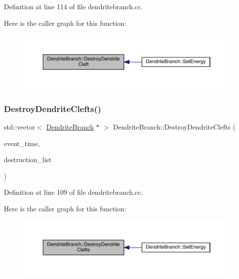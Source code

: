 Definition at line 114 of file dendritebranch.\+cc.

Here is the caller graph for this function\+:
\nopagebreak
\begin{figure}[H]
\begin{center}
\leavevmode
\includegraphics[width=350pt]{class_dendrite_branch_a60225ab106eae6bce25eb8159166d5e9_icgraph}
\end{center}
\end{figure}
\mbox{\label{class_dendrite_branch_a454dd0483439353076df63fc124a24f7}} 
\subsubsection{\texorpdfstring{Destroy\+Dendrite\+Clefts()}{DestroyDendriteClefts()}}
{\footnotesize\ttfamily std\+::vector$<$ \hyperlink{class_dendrite_branch}{Dendrite\+Branch} $\ast$ $>$ Dendrite\+Branch\+::\+Destroy\+Dendrite\+Clefts (\begin{DoxyParamCaption}\item[{std\+::chrono\+::time\+\_\+point$<$ \hyperlink{universe_8h_a0ef8d951d1ca5ab3cfaf7ab4c7a6fd80}{Clock} $>$}]{event\+\_\+time,  }\item[{std\+::vector$<$ \hyperlink{class_dendrite_branch}{Dendrite\+Branch} $\ast$$>$}]{destruction\+\_\+list }\end{DoxyParamCaption})}



Definition at line 109 of file dendritebranch.\+cc.

Here is the caller graph for this function\+:
\nopagebreak
\begin{figure}[H]
\begin{center}
\leavevmode
\includegraphics[width=350pt]{class_dendrite_branch_a454dd0483439353076df63fc124a24f7_icgraph}
\end{center}
\end{figure}
\mbox{\label{class_dendrite_branch_a4d4a4b1591dd612eef903d95605d50fd}} 
